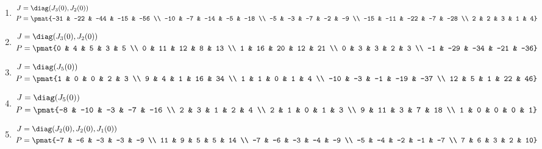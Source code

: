 \begin{enumerate}
\item

\begin{align*}
J &= \diag(J_{3}(0), J_{2}(0))\\
P &= \pmat{-31 & -22 & -44 & -15 & -56 \\ -10 & -7 & -14 & -5 & -18 \\ -5 & -3 & -7 & -2 & -9 \\ -15 & -11 & -22 & -7 & -28 \\ 2 & 2 & 3 & 1 & 4}
\end{align*}

\item

\begin{align*}
J &= \diag(J_{3}(0), J_{2}(0))\\
P &= \pmat{0 & 4 & 5 & 3 & 5 \\ 0 & 11 & 12 & 8 & 13 \\ 1 & 16 & 20 & 12 & 21 \\ 0 & 3 & 3 & 2 & 3 \\ -1 & -29 & -34 & -21 & -36}
\end{align*}

\item

\begin{align*}
J &= \diag(J_{5}(0))\\
P &= \pmat{1 & 0 & 0 & 2 & 3 \\ 9 & 4 & 1 & 16 & 34 \\ 1 & 1 & 0 & 1 & 4 \\ -10 & -3 & -1 & -19 & -37 \\ 12 & 5 & 1 & 22 & 46}
\end{align*}

\item

\begin{align*}
J &= \diag(J_{5}(0))\\
P &= \pmat{-8 & -10 & -3 & -7 & -16 \\ 2 & 3 & 1 & 2 & 4 \\ 2 & 1 & 0 & 1 & 3 \\ 9 & 11 & 3 & 7 & 18 \\ 1 & 0 & 0 & 0 & 1}
\end{align*}

\item

\begin{align*}
J &= \diag(J_{2}(0), J_{2}(0), J_{1}(0))\\
P &= \pmat{-7 & -6 & -3 & -3 & -9 \\ 11 & 9 & 5 & 5 & 14 \\ -7 & -6 & -3 & -4 & -9 \\ -5 & -4 & -2 & -1 & -7 \\ 7 & 6 & 3 & 2 & 10}
\end{align*}


\end{enumerate}
